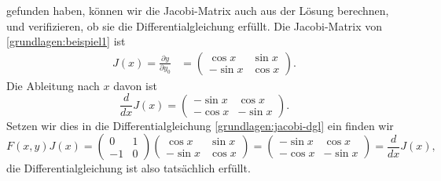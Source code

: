 gefunden haben, können wir die Jacobi-Matrix auch aus der Lösung berechnen,
und verifizieren, ob sie die Differentialgleichung erfüllt.
Die Jacobi-Matrix von \eqref{grundlagen:beispiel1} ist
\begin{align*}
J(x)
=
\frac{\partial y}{\partial y_0}
&=
\begin{pmatrix}
 \cos x&\sin x\\
-\sin x&\cos x
\end{pmatrix}.
\end{align*}
Die Ableitung nach $x$ davon ist
\[
\frac{d}{dx}J(x)
=
\begin{pmatrix}
-\sin x& \cos x\\
-\cos x&-\sin x
\end{pmatrix}.
\]
Setzen wir dies in die Differentialgleichung \eqref{grundlagen:jacobi-dgl} ein
finden wir
\[
F(x,y)J(x)
=
\begin{pmatrix}
 0&1\\
-1&0
\end{pmatrix}
\begin{pmatrix}
 \cos x&\sin x\\
-\sin x&\cos x
\end{pmatrix}
=
\begin{pmatrix}
-\sin x& \cos x\\
-\cos x&-\sin x
\end{pmatrix}
=
\frac{d}{dx}J(x),
\]
die Differentialgleichung ist also tatsächlich erfüllt.

